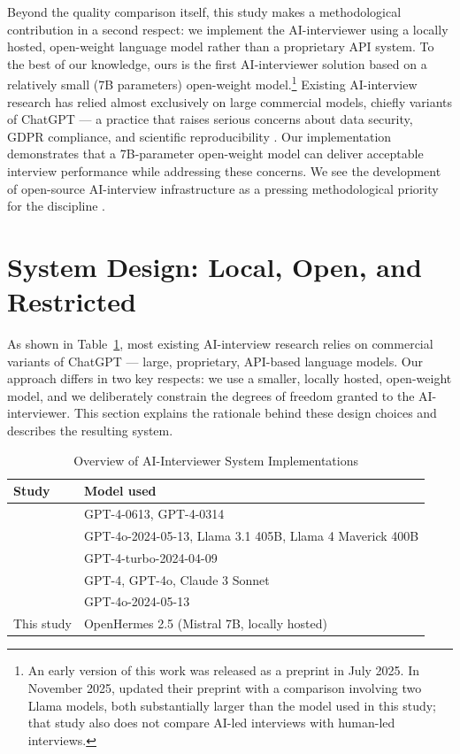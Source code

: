 \documentclass[12pt]{article}
\newcommand{\AII}{AI-interviewer}
\begin{document}
Beyond the quality comparison itself, this study makes a methodological contribution in a second respect: we implement the \AII{} using a locally hosted, open-weight language model rather than a proprietary API system. To the best of our knowledge, ours is the first \AII{} solution based on a relatively small (7B parameters) open-weight model.\footnote{An early version of this work was released as a preprint in July 2025. In November 2025, \citet{geiecke_conversations_2024} updated their preprint with a comparison involving two Llama models, both substantially larger than the model used in this study; that study also does not compare AI-led interviews with human-led interviews.} Existing AI-interview research has relied almost exclusively on large commercial models, chiefly variants of ChatGPT --- a practice that raises serious concerns about data security, GDPR compliance, and scientific reproducibility \citep{palmer_using_2024, Spirling2023}. Our implementation demonstrates that a 7B-parameter open-weight model can deliver acceptable interview performance while addressing these concerns. We see the development of open-source AI-interview infrastructure as a pressing methodological priority for the discipline \citep[see also][]{palmer_using_2024, Spirling2023}.


\section*{System Design: Local, Open, and Restricted}

As shown in Table~\ref{tab:prior}, most existing AI-interview research relies on commercial variants of ChatGPT --- large, proprietary, API-based language models. Our approach differs in two key respects: we use a smaller, locally hosted, open-weight model, and we deliberately constrain the degrees of freedom granted to the \AII{}. This section explains the rationale behind these design choices and describes the resulting system.

\begin{table}[H]
\centering
\caption{Overview of AI-Interviewer System Implementations}
\label{tab:prior}
\begin{tabularx}{\textwidth}{lX}
\toprule
\textbf{Study} & \textbf{Model used} \\
\midrule
\citet{Chopra2023}     & GPT-4-0613, GPT-4-0314 \\
\citet{geiecke_conversations_2024} & GPT-4o-2024-05-13, Llama 3.1 405B, Llama 4 Maverick 400B \\
\citet{Wuttke2024}             & GPT-4-turbo-2024-04-09 \\
\citet{yu_modular_2025}            & GPT-4, GPT-4o, Claude 3 Sonnet \\
\citet{jacobsen_chatbots_2025}     & GPT-4o-2024-05-13 \\
This study                         & OpenHermes 2.5 (Mistral 7B, locally
                                     hosted) \\
\bottomrule
\end{tabularx}
\end{table}
\end{document}
